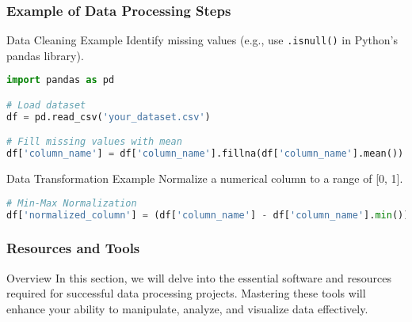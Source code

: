 \documentclass[aspectratio=169]{beamer}
\begin{document}
\begin{frame}[fragile]
    \frametitle{Example of Data Processing Steps}
    \begin{block}{Data Cleaning Example}
    Identify missing values (e.g., use \texttt{.isnull()} in Python's pandas library).
    
    \begin{lstlisting}[language=Python]
import pandas as pd

# Load dataset
df = pd.read_csv('your_dataset.csv')

# Fill missing values with mean
df['column_name'] = df['column_name'].fillna(df['column_name'].mean())
    \end{lstlisting}
    \end{block}
    
    \begin{block}{Data Transformation Example}
    Normalize a numerical column to a range of [0, 1].
    
    \begin{lstlisting}[language=Python]
# Min-Max Normalization
df['normalized_column'] = (df['column_name'] - df['column_name'].min()) / (df['column_name'].max() - df['column_name'].min())
    \end{lstlisting}
    \end{block}
\end{frame}

\begin{frame}
    \frametitle{Resources and Tools}
    \begin{block}{Overview}
        In this section, we will delve into the essential software and resources required for successful data processing projects. Mastering these tools will enhance your ability to manipulate, analyze, and visualize data effectively.
    \end{block}
\end{frame}
\end{document}
